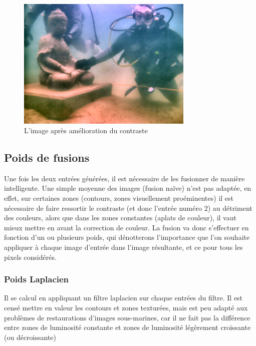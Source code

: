 \documentclass[twoside]{article}
\begin{document}
\begin{figure}[]
  \centering
  \includegraphics[width=0.75\textwidth]{Support/contrast.png}
  \caption{L'image après amélioration du contraste}
\end{figure}

\subsection{Poids de fusions}
Une fois les deux entrées générées, il est nécessaire de les fusionner de manière intelligente. Une simple moyenne des images (fusion naïve) n'est pas adaptée, en effet, sur certaines zones (contours, zones visuellement proéminentes) il est nécessaire de faire ressortir le contraste (et donc l'entrée numéro 2) au détriment des couleurs, alors que dans les zones constantes (aplats de couleur), il vaut mieux mettre en avant la correction de couleur. La fusion va donc s'effectuer en fonction d'un ou plusieurs poids, qui dénotterons l'importance que l'on souhaite appliquer à chaque image d'entrée dans l'image résultante, et ce pour tous les pixels considérés. 

\subsubsection{Poids Laplacien}

Il se calcul en appliquant un filtre laplacien sur chaque entrées du filtre. Il est censé mettre en valeur les contours et zones texturées, mais est peu adapté aux problèmes de restaurations d'images sous-marines, car il ne fait pas la différence entre zones de luminosité constante et zones de luminosité légèrement croissante (ou décroissante)
\end{document}
